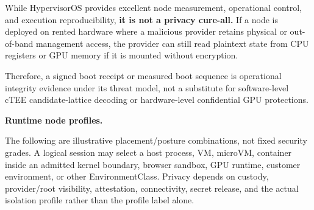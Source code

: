 \documentclass[
  11pt,
]{article}
\begin{document}
While HypervisorOS provides excellent node measurement, operational
control, and execution reproducibility, \textbf{it is not a privacy
cure-all.} If a node is deployed on rented hardware where a malicious
provider retains physical or out-of-band management access, the provider
can still read plaintext state from CPU registers or GPU memory if it is
mounted without encryption.

Therefore, a signed boot receipt or measured boot sequence is operational
integrity evidence under its threat model, not a substitute for
software-level cTEE candidate-lattice decoding or hardware-level
confidential GPU protections.

\textbf{Runtime node profiles.}

The following are illustrative placement/posture combinations, not fixed
security grades. A logical session may select a host process, VM, microVM,
container inside an admitted kernel boundary, browser sandbox, GPU runtime,
customer environment, or other EnvironmentClass. Privacy depends on custody,
provider/root visibility, attestation, connectivity, secret release, and the
actual isolation profile rather than the profile label alone.
\end{document}
